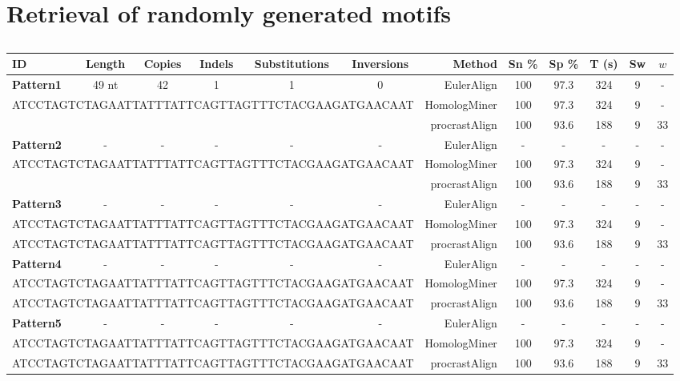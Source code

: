 \documentclass[twoside,11pt]{article}
\begin{document}
\section{Retrieval of randomly generated motifs}
\begin{table}[b]
\scriptsize
  \centering
\begin{tabular}{|lccccc||rccccc|}
\hline ID & Length & Copies & Indels & Substitutions & Inversions & Method & Sn \% & Sp \% & T (s) & Sw & $w$ \\
\hline
\hline \textbf{Pattern1} &  49 nt &  42 & 1 & 1 & 0 & EulerAlign & 100 & 97.3 & 324 & 9 & - \\
\multicolumn{6}{|c||}{\tiny ATCCTAGTCTAGAATTATTTATTCAGTTAGTTTCTACGAAGATGAACAAT} & HomologMiner & 100 & 97.3 & 324 & 9 & - \\
\multicolumn{6}{|c||}{\tiny }& procrastAlign & 100 & 93.6 & 188 & 9 & 33 \\
\hline \textbf{Pattern2} &   - &  - & - & - & - & EulerAlign & - & - & - & - & -  \\
\multicolumn{6}{|c||}{\tiny ATCCTAGTCTAGAATTATTTATTCAGTTAGTTTCTACGAAGATGAACAAT} & HomologMiner & 100 & 97.3 & 324 & 9 & - \\
\multicolumn{6}{|c||}{\tiny }& procrastAlign & 100 & 93.6 & 188 & 9 & 33 \\
\hline \textbf{Pattern3} & - &  - & - & - & - & EulerAlign & - & -& - & - & - \\
\multicolumn{6}{|c||}{\tiny ATCCTAGTCTAGAATTATTTATTCAGTTAGTTTCTACGAAGATGAACAAT} & HomologMiner & 100 & 97.3 & 324 & 9 & - \\
\multicolumn{6}{|c||}{\tiny ATCCTAGTCTAGAATTATTTATTCAGTTAGTTTCTACGAAGATGAACAAT}& procrastAlign & 100 & 93.6 & 188 & 9 & 33 \\
\hline \textbf{Pattern4} & - & - & - & - & - & EulerAlign & -& -& - & - & - \\
\multicolumn{6}{|c||}{\tiny ATCCTAGTCTAGAATTATTTATTCAGTTAGTTTCTACGAAGATGAACAAT} & HomologMiner & 100 & 97.3 & 324 & 9 & - \\
\multicolumn{6}{|c||}{\tiny ATCCTAGTCTAGAATTATTTATTCAGTTAGTTTCTACGAAGATGAACAAT}& procrastAlign & 100 & 93.6 & 188 & 9 & 33 \\
\hline \textbf{Pattern5} & - & - & - & - & - & EulerAlign & -& -& - & - & - \\
\multicolumn{6}{|c||}{\tiny ATCCTAGTCTAGAATTATTTATTCAGTTAGTTTCTACGAAGATGAACAAT} & HomologMiner & 100 & 97.3 & 324 & 9 & - \\
\multicolumn{6}{|c||}{\tiny ATCCTAGTCTAGAATTATTTATTCAGTTAGTTTCTACGAAGATGAACAAT}& procrastAlign & 100 & 93.6 & 188 & 9 & 33 \\
\hline
\end{tabular}
\vspace{0.1cm}
 \label{tab-results}
  \caption{}
 
\end{table}
\end{document}

